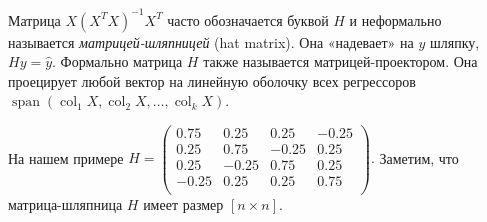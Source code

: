 \documentclass[12pt]{article}
\DeclareMathOperator{\col}{col}
\DeclareMathOperator{\Span}{span}
\begin{document}
\begin{definition}
Матрица $X(X^TX)^{-1} X^T$ часто обозначается буквой $H$ и неформально называется \emph{матрицей-шляпницей} (hat matrix).
Она «надевает» на $y$ шляпку, $Hy = \hat y$.
Формально матрица $H$ также называется матрицей-проектором. 
Она проецирует любой вектор на линейную оболочку всех регрессоров $\Span(\col_1 X, \col_2 X, \dots, \col_k X)$.
\end{definition}

На нашем примере $H = \begin{pmatrix}
    0.75 & 0.25 & 0.25 & -0.25\\
    0.25 & 0.75 & -0.25 & 0.25\\
    0.25 & -0.25 & 0.75 & 0.25\\
    -0.25 & 0.25 & 0.25 & 0.75\\
\end{pmatrix}.$
Заметим, что матрица-шляпница $H$ имеет размер $[n \times n]$.
\end{document}
